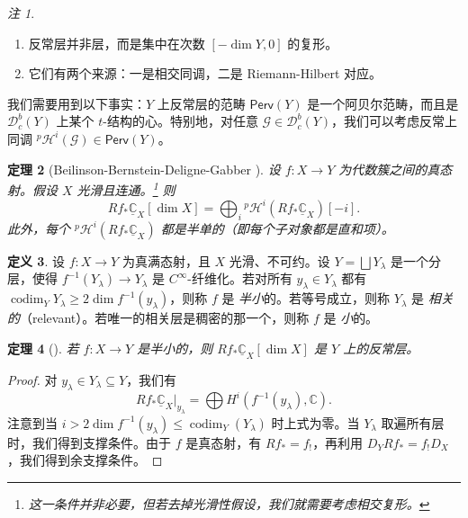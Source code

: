 \documentclass{amsart}
\newtheorem{thm}{定理}[section]
\theoremstyle{definition}
\newtheorem{defn}[thm]{定义}
\theoremstyle{remark}
\newtheorem{rmks}[thm]{注}
\theoremstyle{plain}
\theoremstyle{definition}
\theoremstyle{remark}
\newcommand{\C}{\mathbb{C}}
\newcommand{\mc}[1]{\mathcal{#1}}
\newcommand{\on}[1]{\operatorname{#1}}
\newcommand{\ms}[1]{\mathsf{#1}}
\newcommand{\ul}[1]{\underline{#1}}
\newcommand{\1}{\mathbf{1}}
\newcommand{\2}{\mathbf{2}}
\newcommand{\3}{\mathbf{3}}
\begin{document}
\begin{rmks}\leavevmode
    \begin{enumerate}
        \item 反常层并非层，而是集中在次数 \([-\dim Y, 0]\) 的复形。
        \item 它们有两个来源：一是相交同调，二是 Riemann-Hilbert 对应。
    \end{enumerate}
\end{rmks}

我们需要用到以下事实：\(Y\) 上反常层的范畴 \(\ms{Perv}(Y)\) 是一个阿贝尔范畴，而且是 \(\mc{D}_c^b(Y)\) 上某个 \(t\)-结构的心。特别地，对任意 \(\mc{G} \in \mc{D}_c^b (Y)\)，我们可以考虑反常上同调 \(^p\mc{H}^i(\mc{G}) \in \ms{Perv}(Y)\)。

\begin{thm}[Beilinson-Bernstein-Deligne-Gabber {\cite{BBD1982}}]
    设 \(f \colon X \to Y\) 为代数簇之间的真态射。假设 \(X\) 光滑且连通。\footnote{这一条件并非必要，但若去掉光滑性假设，我们就需要考虑相交复形。} 则
    \[ R f_* \ul{\C}_X [\dim X] = \bigoplus_{i} {^p\mc{H}^i}(R f_* \ul{\C}_X)[-i]. \]
    此外，每个 \(^p\mc{H}^i (R f_* \ul{\C}_X)\) 都是半单的（即每个子对象都是直和项）。
\end{thm}

\begin{defn}
    设 \(f \colon X \to Y\) 为真满态射，且 \(X\) 光滑、不可约。设 \(Y = \bigsqcup Y_{\lambda}\) 是一个分层，使得 \(f^{-1}(Y_{\lambda}) \to Y_{\lambda}\) 是 \(C^{\infty}\)-纤维化。若对所有 \(y_{\lambda} \in Y_{\lambda}\) 都有 \(\on{codim}_Y Y_{\lambda} \geq 2 \dim f^{-1} (y_{\lambda})\)，则称 \(f\) 是 \textit{半小}的。若等号成立，则称 \(Y_{\lambda}\) 是 \textit{相关的}（relevant）。若唯一的相关层是稠密的那一个，则称 \(f\) 是 \textit{小}的。
\end{defn}

\begin{thm}[{\cite{DeCataldoMigliorini2002}}]
    若 \(f \colon X \to Y\) 是半小的，则 \(R f_* \ul{\C}_X [\dim X]\) 是 \(Y\) 上的反常层。
\end{thm}

\begin{proof}
    对 \(y_{\lambda} \in Y_{\lambda} \subseteq Y\)，我们有
    \[ R f_* \ul{\C}_X |_{y_{\lambda}} = \bigoplus H^i (f^{-1}(y_{\lambda}), \C). \]
    注意到当 \(i > 2 \dim f^{-1}(y_{\lambda}) \leq \on{codim}_Y (Y_{\lambda})\) 时上式为零。当 \(Y_{\lambda}\) 取遍所有层时，我们得到支撑条件。由于 \(f\) 是真态射，有 \(R f_* = f_!\)，再利用 \(D_Y R f_* = f_! D_X\)，我们得到余支撑条件。
\end{proof}
\end{document}
